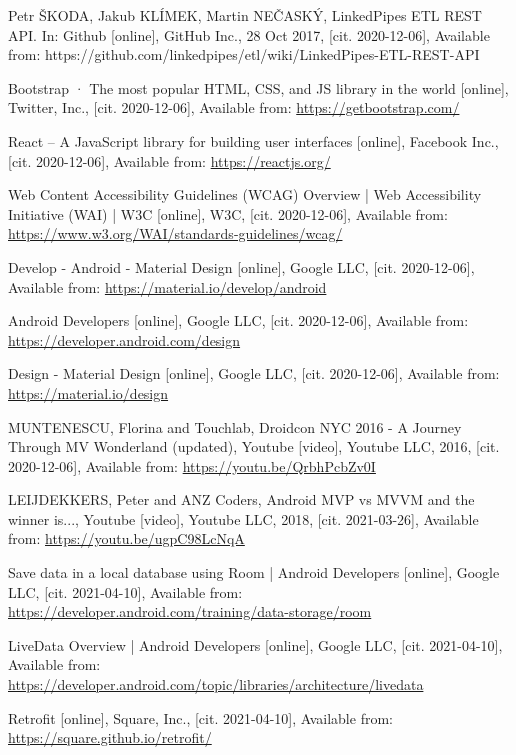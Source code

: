 \begin{thebibliography}{99}

 Petr ŠKODA, Jakub KLÍMEK, Martin NEČASKÝ, LinkedPipes ETL REST API. In: Github [online], GitHub Inc., 28 Oct 2017, [cit. 2020-12-06], Available from: https://github.com/linkedpipes/etl/wiki/LinkedPipes-ETL-REST-API

 Bootstrap · The most popular HTML, CSS, and JS library in the world [online], Twitter, Inc., [cit. 2020-12-06], Available from: \url{https://getbootstrap.com/}

 React – A JavaScript library for building user interfaces [online], Facebook Inc., [cit. 2020-12-06], Available from: \url{https://reactjs.org/}

 Web Content Accessibility Guidelines (WCAG) Overview | Web Accessibility Initiative (WAI) | W3C [online], W3C, [cit. 2020-12-06], Available from: \url{https://www.w3.org/WAI/standards-guidelines/wcag/}

 Develop - Android - Material Design [online], Google LLC, [cit. 2020-12-06], Available from: \url{https://material.io/develop/android}

 Android Developers [online], Google LLC, [cit. 2020-12-06], Available from: \url{https://developer.android.com/design}

 Design - Material Design [online], Google LLC, [cit. 2020-12-06], Available from: \url{https://material.io/design}

 MUNTENESCU, Florina and Touchlab, Droidcon NYC 2016 - A Journey Through MV Wonderland (updated), Youtube [video], Youtube LLC, 2016, [cit. 2020-12-06], Available from: \url{https://youtu.be/QrbhPcbZv0I}

 LEIJDEKKERS, Peter and ANZ Coders, Android MVP vs MVVM and the winner is..., Youtube [video], Youtube LLC, 2018, [cit. 2021-03-26], Available from: \url{https://youtu.be/ugpC98LcNqA}

 Save data in a local database using Room | Android Developers [online], Google LLC, [cit. 2021-04-10], Available from: \url{https://developer.android.com/training/data-storage/room}

 LiveData Overview | Android Developers [online], Google LLC, [cit. 2021-04-10], Available from: \url{https://developer.android.com/topic/libraries/architecture/livedata}

 Retrofit [online], Square, Inc., [cit. 2021-04-10], Available from: \url{https://square.github.io/retrofit/}


\end{thebibliography}
